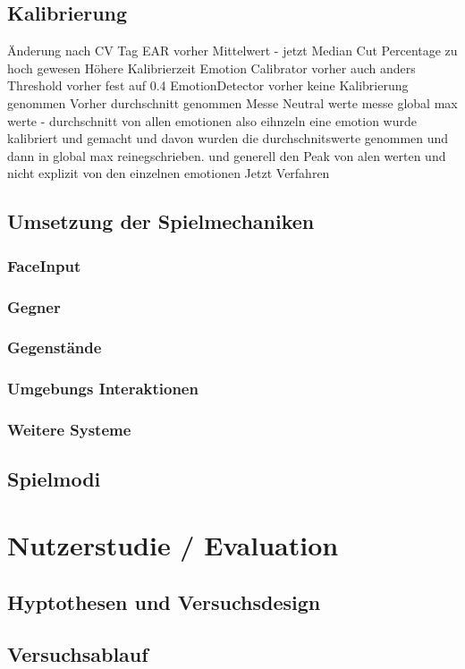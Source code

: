 \documentclass[intern]{cgMA}
\begin{document}
\subsection{Kalibrierung}
Änderung nach CV Tag
EAR vorher Mittelwert - jetzt Median
Cut Percentage zu hoch gewesen
Höhere Kalibrierzeit
Emotion Calibrator vorher auch anders
Threshold vorher fest auf 0.4
EmotionDetector vorher keine Kalibrierung genommen
Vorher durchschnitt genommen 
Messe Neutral werte
messe global max werte - durchschnitt von allen emotionen also eihnzeln
eine emotion wurde kalibriert und gemacht und davon wurden die durchschnitswerte genommen und dann in global max reinegschrieben.
und generell den Peak von alen werten und nicht explizit von den einzelnen emotionen
Jetzt Verfahren

\subsection{Umsetzung der Spielmechaniken}
\subsubsection{FaceInput}
\subsubsection{Gegner}
\subsubsection{Gegenstände}
\subsubsection{Umgebungs Interaktionen}
\subsubsection{Weitere Systeme}
\subsection{Spielmodi}
\section{Nutzerstudie / Evaluation}
\subsection{Hyptothesen und Versuchsdesign}
\subsection{Versuchsablauf}
\end{document}
